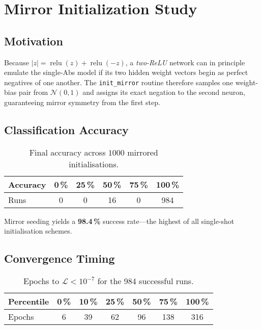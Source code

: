 \section{Mirror Initialization Study}
\label{sec:relu1-mirror}

\subsection*{Motivation}
Because \(|z| = \operatorname{relu}(z) + \operatorname{relu}(-z)\), a
\emph{two-ReLU} network can in principle emulate the single-Abs model if
its two hidden weight vectors begin as perfect negatives of one another.
The \texttt{init\_mirror} routine therefore samples one weight-bias pair
from \(\mathcal N(0,1)\) and assigns its exact negation to the second
neuron, guaranteeing mirror symmetry from the first step.

\subsection*{Classification Accuracy}

\begin{table}[h]
\centering
\caption{Final accuracy across $1000$ mirrored initialisations.}
\label{tab:relu1-mirror-accuracy}
\begin{tabular}{lccccc}
\toprule
Accuracy & 0\,\% & 25\,\% & 50\,\% & 75\,\% & 100\,\% \\
\midrule
Runs & 0 & 0 & 16 & 0 & 984 \\
\bottomrule
\end{tabular}
\end{table}

Mirror seeding yields a \textbf{98.4\,\%} success rate—the highest of
all single-shot initialisation schemes.

\subsection*{Convergence Timing}

\begin{table}[h]
\centering
\caption{Epochs to $\mathcal L<10^{-7}$ for the 984 successful runs.}
\label{tab:relu1-mirror-epochs}
\begin{tabular}{lcccccc}
\toprule
Percentile & 0\,\% & 10\,\% & 25\,\% & 50\,\% & 75\,\% & 100\,\% \\ \midrule
Epochs & 6 & 39 & 62 & 96 & 138 & 316 \\
\bottomrule
\end{tabular}
\end{table}

